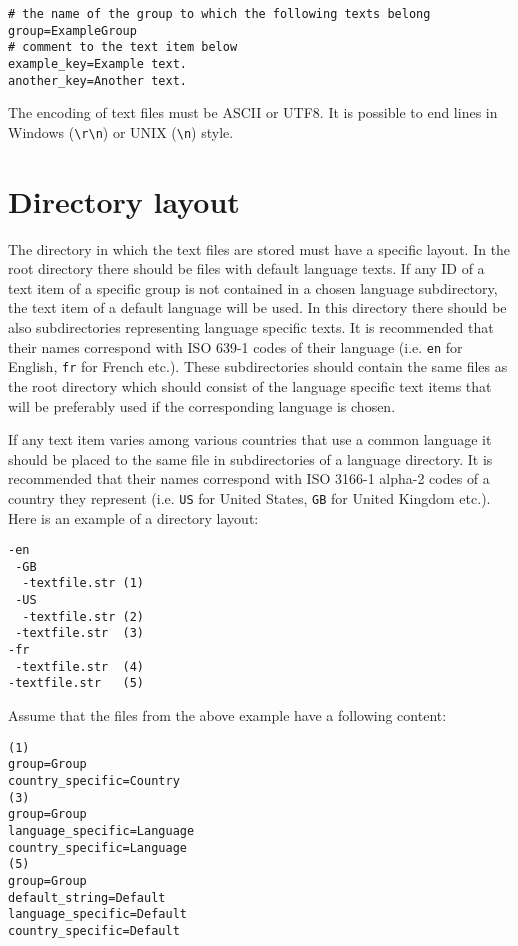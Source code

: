 \begin{verbatim}
# the name of the group to which the following texts belong
group=ExampleGroup
# comment to the text item below
example_key=Example text.
another_key=Another text.
\end{verbatim}

The encoding of text files must be ASCII or UTF8. It is possible to end lines in Windows (\verb/\r\n/) or UNIX (\verb/\n/) style.

\section{Directory layout}
\label{sec:dir-layout}

The directory in which the text files are stored must have a specific layout. In the root directory there should be files with default language texts. If any ID of a text item of a specific group is not contained in a chosen language subdirectory, the text item of a default language will be used. In this directory there should be also subdirectories representing language specific texts. It is recommended that their names correspond with ISO 639-1 codes \cite{ISO-639-1} of their language (i.e. \verb/en/ for English, \verb/fr/ for French etc.). These subdirectories should contain the same files as the root directory which should consist of the language specific text items that will be preferably used if the corresponding language is chosen.

If any text item varies among various countries that use a common language it should be placed to the same file in subdirectories of a language directory. It is recommended that their names correspond with ISO 3166-1 alpha-2 codes \cite{ISO-3166-1} of a country they represent (i.e. \verb/US/ for United States, \verb/GB/ for United Kingdom etc.). Here is an example of a directory layout:

\begin{verbatim}
-en
 -GB
  -textfile.str (1)
 -US
  -textfile.str (2)
 -textfile.str  (3)
-fr
 -textfile.str  (4)
-textfile.str   (5)
\end{verbatim}

Assume that the files from the above example have a following content:

\begin{verbatim}
(1)
group=Group
country_specific=Country
(3)
group=Group
language_specific=Language
country_specific=Language
(5)
group=Group
default_string=Default
language_specific=Default
country_specific=Default
\end{verbatim}

